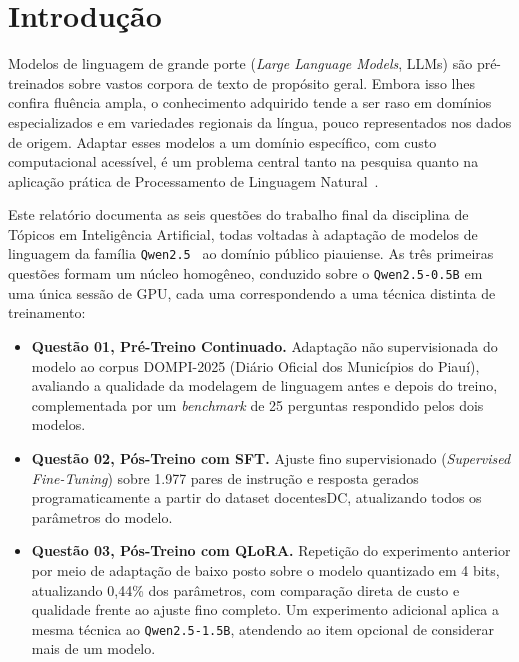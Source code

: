 \section{Introdução}

Modelos de linguagem de grande porte (\textit{Large Language Models}, LLMs) são
pré-treinados sobre vastos corpora de texto de propósito geral. Embora isso lhes
confira fluência ampla, o conhecimento adquirido tende a ser raso em domínios
especializados e em variedades regionais da língua, pouco representados nos dados
de origem. Adaptar esses modelos a um domínio específico, com custo computacional
acessível, é um problema central tanto na pesquisa quanto na aplicação prática de
Processamento de Linguagem Natural~\cite{gururangan2020dont}.

Este relatório documenta as seis questões do trabalho final da disciplina de
Tópicos em Inteligência Artificial, todas voltadas à adaptação de modelos de
linguagem da família \texttt{Qwen2.5}~\cite{qwen2025} ao domínio público piauiense.
As três primeiras questões formam um núcleo homogêneo, conduzido sobre o
\texttt{Qwen2.5-0.5B} em uma única sessão de GPU, cada uma correspondendo a uma
técnica distinta de treinamento:

\begin{itemize}[leftmargin=2.2em]
  \item \textbf{Questão 01, Pré-Treino Continuado.} Adaptação não supervisionada
        do modelo ao corpus DOMPI-2025 (Diário Oficial dos Municípios do Piauí),
        avaliando a qualidade da modelagem de linguagem antes e depois do treino,
        complementada por um \textit{benchmark} de 25 perguntas respondido pelos
        dois modelos.
  \item \textbf{Questão 02, Pós-Treino com SFT.} Ajuste fino supervisionado
        (\textit{Supervised Fine-Tuning}) sobre 1.977 pares de instrução e resposta
        gerados programaticamente a partir do dataset docentesDC, atualizando todos
        os parâmetros do modelo.
  \item \textbf{Questão 03, Pós-Treino com QLoRA.} Repetição do experimento
        anterior por meio de adaptação de baixo posto sobre o modelo quantizado em
        4 bits, atualizando 0,44\% dos parâmetros, com comparação direta de custo e
        qualidade frente ao ajuste fino completo. Um experimento adicional aplica a
        mesma técnica ao \texttt{Qwen2.5-1.5B}, atendendo ao item opcional de
        considerar mais de um modelo.
\end{itemize}

